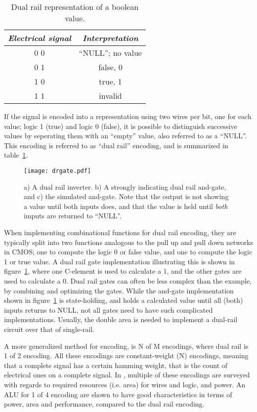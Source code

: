 \begin{table}
  \centering
  \begin{tabular}{|c|c|}
    \hline
    \emph{Electrical signal} & \emph{Interpretation} \\
    \hline
    0 0 & ``NULL''; no value \\
    0 1 & false, 0 \\
    1 0 & true, 1 \\
    1 1 & invalid \\
    \hline
  \end{tabular}
  \label{tab:dr}
  \caption{Dual rail representation of a boolean value.}
\end{table}

If the signal is encoded into a representation using two wires per
bit, one for each value; logic 1 (true) and logic 0 (false), it is
possible to distinguish successive values by seperating them with an
``empty'' value, also referred to as a ``NULL''. This encoding is
referred to as ``dual rail'' encoding, and is summarized in
table~\ref{tab:dr}.

\begin{figure}[htbp]
  \centering
  \texttt{[image: drgate.pdf]}
  \caption{a) A dual rail inverter. b) A strongly indicating dual rail
    and-gate, and c) the simulated and-gate. Note that the output is
    not showing a value until both inputs does, and that the value is
    held until \emph{both} imputs are returned to ``NULL''.}
  \label{fig:drgate}
\end{figure}

When implementing combinational functions for dual rail encoding, they
are typically split into two functions analogous to the pull up and
pull down networks in CMOS; one to compute the logic 0 or false value,
and one to compute the logic 1 or true value. A dual rail gate
implementation illustrating this is shown in figure~\ref{fig:drgate},
where one C-element is used to calculate a 1, and the other gates are
used to calculate a 0. Dual rail gates can often be less complex than
the example, by combining and optimizing the gates. While the and-gate
implementation shown in figure~\ref{fig:drgate} is state-holding, and
holds a calculated value until all (both) inputs returns to NULL, not
all gates need to have such complicated implementations. Usually, the
double area is needed to implement a dual-rail circuit over that of
single-rail.

A more generalized method for encoding, is N of M encodings, where
dual rail is 1 of 2 encoding. All these encodings are constant-weight
(N) encodings, meaning that a complete signal has a certain hamming
weight, that is the count of electrical ones on a complete signal. In
\cite[chapter 9]{nullconv}, multiple of these encodings are surveyed
with regards to required resources (i.e. area) for wires and logic,
and power. An ALU for 1 of 4 encoding are shown to have good
characteristics in terms of power, area and performance, compared to
the dual rail encoding.

